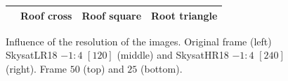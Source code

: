 \documentclass{article}
\newcommand{\Dpar}[2]{\frac{\partial#1}{\partial#2}}
\newcommand{\vect}[1]{\mathbf{#1}}
\theoremstyle{definition}
\begin{document}
\begin{figure}[ht]
\begin{tabular}{|c||c|c|c|}
  \hline
  & Roof cross & Roof square & Root triangle \\ \hline
 \end{tabular}
 \caption{Influence of the resolution of the images. Original frame (left) SkysatLR18 $-1:4$ $[120]$ (middle) and SkysatHR18 $-1:4$ $[240]$ (right). Frame $50$ (top) and $25$ (bottom).}
 \label{fig:comparison_details}
\end{figure}



% 
% 
%  
%  
\end{document}
